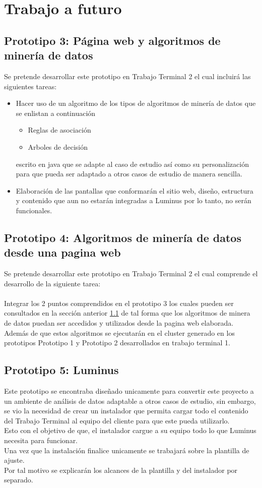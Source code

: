 \section{Trabajo a futuro} 
\subsection{Prototipo 3: Página web y algoritmos de minería de datos}
\label{proto3}
Se pretende desarrollar este prototipo en Trabajo Terminal 2 el cual incluirá las siguientes tareas:
\begin{itemize}
	\item Hacer uso de un algoritmo de los tipos de algoritmos de minería de datos que se enlistan a continuación
	\begin{itemize}
		\item Reglas de asociación
		\item Arboles de decisión
	\end{itemize}
	 escrito en java que se adapte al caso de estudio así como su personalización para que pueda ser adaptado a otros casos de estudio de manera sencilla.
	\item Elaboración de las pantallas que conformarán el sitio web, diseño, estructura y contenido que aun no estarán integradas a Luminus por lo tanto, no serán funcionales.  
\end{itemize}
\subsection{Prototipo 4: Algoritmos de minería de datos desde una pagina web}
Se pretende desarrollar este prototipo en Trabajo Terminal 2 el cual comprende el desarrollo de la siguiente tarea:
\\ 
\\ 
Integrar los 2 puntos comprendidos en el prototipo 3 los cuales pueden ser consultados en la sección anterior \ref{proto3} de tal forma que los algoritmos de minera de datos puedan ser accedidos y utilizados desde la pagina web elaborada. 
\\
Además de que estos algoritmos se ejecutarán en el cluster generado en los prototipos Prototipo 1  y Prototipo 2  desarrollados en trabajo terminal 1.
\subsection{Prototipo 5: Luminus}
Este prototipo se encontraba diseñado unicamente para convertir este proyecto a un ambiente de análisis de datos adaptable a otros casos de estudio, sin embargo, se vio la necesidad de crear un instalador que permita cargar todo el contenido del Trabajo Terminal al equipo del cliente para que este pueda utilizarlo.\\
Esto con el objetivo de que, el instalador cargue a su equipo todo lo que Luminus necesita para funcionar.
\\
Una vez que la instalación finalice unicamente se trabajará sobre la plantilla de ajuste. \\
Por tal motivo se explicarán los alcances de la plantilla y del instalador por separado.
